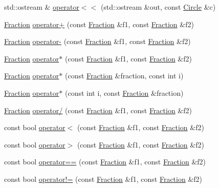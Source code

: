 \begin{DoxyCompactItemize}
std\+::ostream \& \hyperlink{namespaceprism_aa63d3d39d3fad8fa5c5966cc4f306324}{operator$<$$<$} (std\+::ostream \&out, const \hyperlink{classprism_1_1_circle}{Circle} \&c)
\item 
\hyperlink{classprism_1_1_fraction}{Fraction} \hyperlink{namespaceprism_ac1b5b2765c314b2baa2dba5c57419829}{operator+} (const \hyperlink{classprism_1_1_fraction}{Fraction} \&f1, const \hyperlink{classprism_1_1_fraction}{Fraction} \&f2)
\item 
\hyperlink{classprism_1_1_fraction}{Fraction} \hyperlink{namespaceprism_a2daf470e5f35f8450447deb2634c22c1}{operator-\/} (const \hyperlink{classprism_1_1_fraction}{Fraction} \&f1, const \hyperlink{classprism_1_1_fraction}{Fraction} \&f2)
\item 
\hyperlink{classprism_1_1_fraction}{Fraction} \hyperlink{namespaceprism_ac4f48e3429a86bafcc7c21a2bd6a7ae1}{operator$\ast$} (const \hyperlink{classprism_1_1_fraction}{Fraction} \&f1, const \hyperlink{classprism_1_1_fraction}{Fraction} \&f2)
\item 
\hyperlink{classprism_1_1_fraction}{Fraction} \hyperlink{namespaceprism_a1f5007702b28b447f62c3b9df62f2aa4}{operator$\ast$} (const \hyperlink{classprism_1_1_fraction}{Fraction} \&fraction, const int i)
\item 
\hyperlink{classprism_1_1_fraction}{Fraction} \hyperlink{namespaceprism_af1ff5871f65565a84b886c5013bcd50a}{operator$\ast$} (const int i, const \hyperlink{classprism_1_1_fraction}{Fraction} \&fraction)
\item 
\hyperlink{classprism_1_1_fraction}{Fraction} \hyperlink{namespaceprism_a7ba7b5cc9750f0d6cda50f0cb874da6f}{operator/} (const \hyperlink{classprism_1_1_fraction}{Fraction} \&f1, const \hyperlink{classprism_1_1_fraction}{Fraction} \&f2)
\item 
const bool \hyperlink{namespaceprism_a105ac9995ade66ebb2a039ef90751c7a}{operator$<$} (const \hyperlink{classprism_1_1_fraction}{Fraction} \&f1, const \hyperlink{classprism_1_1_fraction}{Fraction} \&f2)
\item 
const bool \hyperlink{namespaceprism_a7122a7ff43fc6aba9cef9d31fe8c7559}{operator$>$} (const \hyperlink{classprism_1_1_fraction}{Fraction} \&f1, const \hyperlink{classprism_1_1_fraction}{Fraction} \&f2)
\item 
const bool \hyperlink{namespaceprism_a5b9e84008b9eaa99d29d4b74cd150cd8}{operator==} (const \hyperlink{classprism_1_1_fraction}{Fraction} \&f1, const \hyperlink{classprism_1_1_fraction}{Fraction} \&f2)
\item 
const bool \hyperlink{namespaceprism_aea72179b12983e614f72acd2b3cbf0e0}{operator!=} (const \hyperlink{classprism_1_1_fraction}{Fraction} \&f1, const \hyperlink{classprism_1_1_fraction}{Fraction} \&f2)

\end{DoxyCompactItemize}

